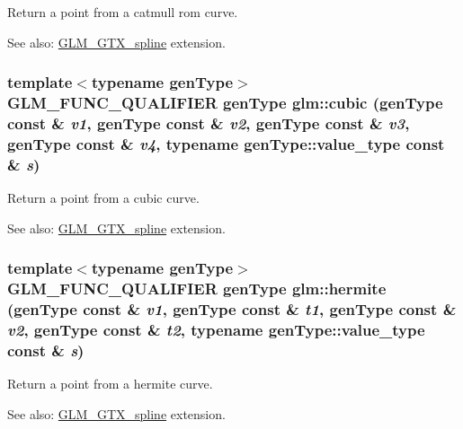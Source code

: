 Return a point from a catmull rom curve. \begin{Desc}
\item[See also:]\hyperlink{group__gtx__spline}{GLM\_\-GTX\_\-spline} extension. \end{Desc}
\hypertarget{group__gtx__spline_g46e54d27ad211a24813f19b80aba0329}{
\subsubsection[cubic]{\setlength{\rightskip}{0pt plus 5cm}template$<$typename genType$>$ GLM\_\-FUNC\_\-QUALIFIER genType glm::cubic (genType const \& {\em v1}, \/  genType const \& {\em v2}, \/  genType const \& {\em v3}, \/  genType const \& {\em v4}, \/  typename genType::value\_\-type const \& {\em s})}}
\label{group__gtx__spline_g46e54d27ad211a24813f19b80aba0329}


Return a point from a cubic curve. \begin{Desc}
\item[See also:]\hyperlink{group__gtx__spline}{GLM\_\-GTX\_\-spline} extension. \end{Desc}
\hypertarget{group__gtx__spline_ge95792c83c014a3c61b35312fb02679f}{
\subsubsection[hermite]{\setlength{\rightskip}{0pt plus 5cm}template$<$typename genType$>$ GLM\_\-FUNC\_\-QUALIFIER genType glm::hermite (genType const \& {\em v1}, \/  genType const \& {\em t1}, \/  genType const \& {\em v2}, \/  genType const \& {\em t2}, \/  typename genType::value\_\-type const \& {\em s})}}
\label{group__gtx__spline_ge95792c83c014a3c61b35312fb02679f}


Return a point from a hermite curve. \begin{Desc}
\item[See also:]\hyperlink{group__gtx__spline}{GLM\_\-GTX\_\-spline} extension. \end{Desc}
